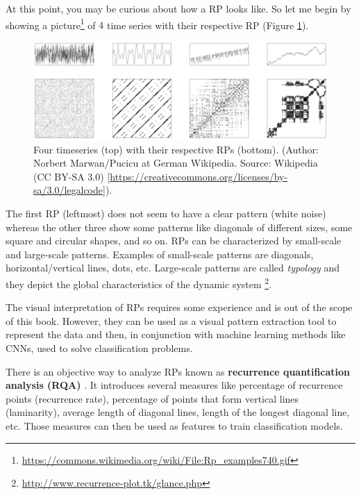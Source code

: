 \documentclass[
  11pt,
]{krantz}
\makeatletter
\newenvironment{kframe}{%
\medskip{}
\setlength{\fboxsep}{.8em}
 \def\at@end@of@kframe{}%
 \ifinner\ifhmode%
  \def\at@end@of@kframe{\end{minipage}}%
  \begin{minipage}{\columnwidth}%
 \fi\fi%
 \def\FrameCommand##1{\hskip\@totalleftmargin \hskip-\fboxsep
 \colorbox{shadecolor}{##1}\hskip-\fboxsep
     \hskip-\linewidth \hskip-\@totalleftmargin \hskip\columnwidth}%
 \MakeFramed {\advance\hsize-\width
   \@totalleftmargin\z@ \linewidth\hsize
   \@setminipage}}%
 {\par\unskip\endMakeFramed%
 \at@end@of@kframe}
\newenvironment{rmdblock}[1]
  {
  \begin{itemize}
  \renewcommand{\labelitemi}{
    \raisebox{-.7\height}[0pt][0pt]{
      {\setkeys{Gin}{width=3em,keepaspectratio}\texttt{[image: images/icons/\#1]}}
    }
  }
  \setlength{\fboxsep}{1em}
  \begin{kframe}
  \item
  }
  {
  \end{kframe}
  \end{itemize}
  }
\newenvironment{rmdinfo}
  {\begin{rmdblock}{info}}
  {\end{rmdblock}}
\makeatother
\begin{document}
At this point, you may be curious about how a RP looks like. So let me begin by showing a picture\footnote{\url{https://commons.wikimedia.org/wiki/File:Rp_examples740.gif}} of \(4\) time series with their respective RP (Figure \ref{fig:rpExamples}).



\begin{figure}

{\centering \includegraphics[width=0.8\linewidth]{images/RP_examples} 

}

\caption{Four timeseries (top) with their respective RPs (bottom). (Author: Norbert Marwan/Pucicu at German Wikipedia. Source: Wikipedia (CC BY-SA 3.0) {[}\url{https://creativecommons.org/licenses/by-sa/3.0/legalcode}{]}).}\label{fig:rpExamples}
\end{figure}

The first RP (leftmost) does not seem to have a clear pattern (white noise) whereas the other three show some patterns like diagonals of different sizes, some square and circular shapes, and so on. RPs can be characterized by small-scale and large-scale patterns. Examples of small-scale patterns are diagonals, horizontal/vertical lines, dots, etc. Large-scale patterns are called \emph{typology} and they depict the global characteristics of the dynamic system \footnote{\url{http://www.recurrence-plot.tk/glance.php}}.

The visual interpretation of RPs requires some experience and is out of the scope of this book. However, they can be used as a visual pattern extraction tool to represent the data and then, in conjunction with machine learning methods like CNNs, used to solve classification problems.

\begin{rmdinfo}
There is an objective way to analyze RPs known as \textbf{recurrence quantification analysis (RQA)} \citep{ZBILUT1992}. It introduces several measures like percentage of recurrence points (recurrence rate), percentage of points that form vertical lines (laminarity), average length of diagonal lines, length of the longest diagonal line, etc. Those measures can then be used as features to train classification models.
\end{rmdinfo}
\end{document}
